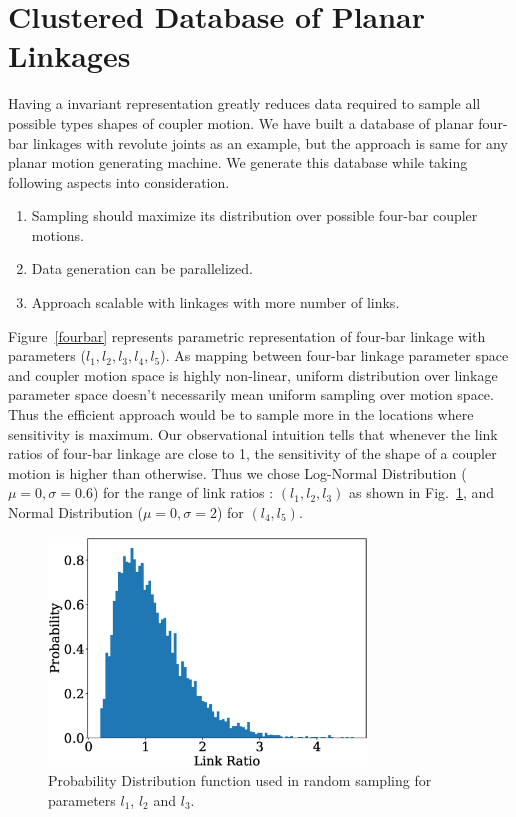\documentclass[twocolumn,10pt]{asme2ej}
\begin{document}
\section{Clustered Database of Planar Linkages}
Having a invariant representation greatly reduces data required to sample all possible types shapes of coupler motion.
We have built a database of planar four-bar linkages with revolute joints as an example, but the approach is same for any planar motion generating machine.
We generate this database while taking following aspects into consideration.
\begin{enumerate}
  \item Sampling should maximize its distribution over possible four-bar coupler motions.
  \item Data generation can be parallelized.
  \item Approach scalable with linkages with more number of links.
\end{enumerate}
Figure~\ref{fourbar} represents parametric representation of four-bar linkage with parameters ($l_1,l_2,l_3,l_4,l_5$).
As mapping between four-bar linkage parameter space and coupler motion space is highly non-linear, uniform distribution over linkage parameter space doesn't necessarily mean uniform sampling over motion space.
Thus the efficient approach would be to sample more in the locations where sensitivity is maximum.
Our observational intuition tells that whenever the link ratios of four-bar linkage are close to 1, the sensitivity of the shape of a coupler motion is higher than otherwise.
Thus we chose Log-Normal Distribution ($\mu = 0,\sigma = 0.6 $) for the range of link ratios : $(l_1, l_2, l_3)$ as shown in Fig.~\ref{logNormal}, and Normal Distribution ($\mu = 0,\sigma = 2 $) for $(l_4, l_5)$.

\begin{figure}
\centering
\includegraphics[width=240pt]{figure/fig_logNormal.eps}
  \caption{Probability Distribution function used in random sampling for parameters $l_1$, $l_2$ and $l_3$.}
\label{logNormal}
\end{figure}
\end{document}
